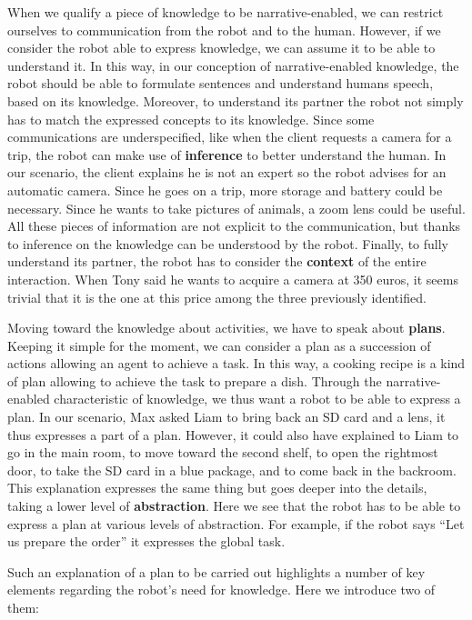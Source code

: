 When we qualify a piece of knowledge to be narrative-enabled, we can restrict ourselves to communication from the robot and to the human. However, if we consider the robot able to express knowledge, we can assume it to be able to understand it. In this way, in our conception of narrative-enabled knowledge, the robot should be able to formulate sentences and understand humans speech, based on its knowledge. Moreover, to understand its partner the robot not simply has to match the expressed concepts to its knowledge. Since some communications are underspecified, like when the client requests a camera for a trip, the robot can make use of \textbf{inference} to better understand the human. In our scenario, the client explains he is not an expert so the robot advises for an automatic camera. Since he goes on a trip, more storage and battery could be necessary. Since he wants to take pictures of animals, a zoom lens could be useful. All these pieces of information are not explicit to the communication, but thanks to inference on the knowledge can be understood by the robot. Finally, to fully understand its partner, the robot has to consider the \textbf{context} of the entire interaction. When Tony said he wants to acquire a camera at 350 euros, it seems trivial that it is the one at this price among the three previously identified.

Moving toward the knowledge about activities, we have to speak about \textbf{plans}. Keeping it simple for the moment, we can consider a plan as a succession of actions allowing an agent to achieve a task. In this way, a cooking recipe is a kind of plan allowing to achieve the task to prepare a dish. Through the narrative-enabled characteristic of knowledge, we thus want a robot to be able to express a plan. In our scenario, Max asked Liam to bring back an SD card and a lens, it thus expresses a part of a plan. However, it could also have explained to Liam to go in the main room, to move toward the second shelf, to open the rightmost door, to take the SD card in a blue package, and to come back in the backroom. This explanation expresses the same thing but goes deeper into the details, taking a lower level of \textbf{abstraction}. Here we see that the robot has to be able to express a plan at various levels of abstraction. For example, if the robot says ``Let us prepare the order'' it expresses the global task.

Such an explanation of a plan to be carried out highlights a number of key elements regarding the robot's need for knowledge. Here we introduce two of them:

